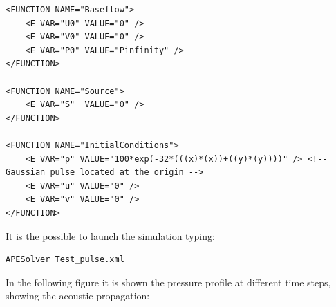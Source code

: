 \begin{lstlisting}[style=XmlStyle]
<FUNCTION NAME="Baseflow"> 
    <E VAR="U0" VALUE="0" />
    <E VAR="V0" VALUE="0" />
    <E VAR="P0" VALUE="Pinfinity" />
</FUNCTION>

<FUNCTION NAME="Source"> 
    <E VAR="S"  VALUE="0" />
</FUNCTION>

<FUNCTION NAME="InitialConditions">
    <E VAR="p" VALUE="100*exp(-32*(((x)*(x))+((y)*(y))))" /> <!-- Gaussian pulse located at the origin -->
    <E VAR="u" VALUE="0" />
    <E VAR="v" VALUE="0" />
</FUNCTION>
\end{lstlisting}

It is the possible to launch the simulation typing:

\begin{lstlisting}[style=BashInputStyle]
APESolver Test_pulse.xml
\end{lstlisting}

In the following figure it is shown the pressure profile at different time
steps, showing the acoustic propagation:

